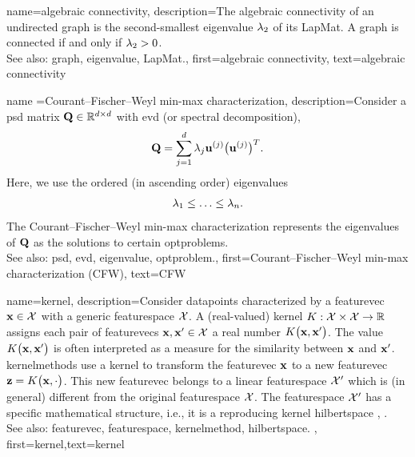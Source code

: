 {name={algebraic connectivity},
	description={The algebraic connectivity of an undirected \gls{graph} 
		is the second-smallest \gls{eigenvalue} $\lambda_{2}$ of its \gls{LapMat}. A \gls{graph} is connected if and only if 
		$\lambda_{2} >0$. 
				\\
		See also: \gls{graph}, \gls{eigenvalue}, \gls{LapMat}.},
	first={algebraic connectivity},
	text={algebraic connectivity}
}


{name ={Courant–Fischer–Weyl min-max characterization}, 
	description={Consider a \gls{psd} 
	matrix $\mathbf{Q} \in \mathbb{R}^{d \times d}$ with 
	\gls{evd} (or spectral decomposition), 
	$$ \mathbf{Q} = \sum_{j=1}^{d} \lambda_{j} {\bf u}^{(j)} \big(  {\bf u}^{(j)}  \big)^{T}.$$ 
	Here, we use the ordered (in ascending order) \glspl{eigenvalue} 
	\begin{equation}
		\nonumber
		 \lambda_{1}  \leq  \ldots \leq \lambda_{n}. 
	\end{equation}
	The Courant–Fischer–Weyl min-max characterization \cite[Th. 8.1.2]{GolubVanLoanBook} 
	represents the \glspl{eigenvalue} of $\mathbf{Q}$ as the solutions to certain \glspl{optproblem}.
			\\
		See also: \gls{psd}, \gls{evd}, \gls{eigenvalue}, \gls{optproblem}.}, 
	first={Courant–Fischer–Weyl min-max characterization (CFW)}, 
	text={CFW}
}

{name={kernel}, 
	description={Consider \glspl{datapoint} characterized by a \gls{featurevec} ${\bf x} \in \mathcal{X}$ 
		with a generic \gls{featurespace} $\mathcal{X}$. A (real-valued) kernel $K: \mathcal{X} \times \mathcal{X} \rightarrow \mathbb{R}$ 
		assigns each pair of \glspl{featurevec} ${\bf x}, {\bf x}' \in \mathcal{X}$ a real number $K\big({\bf x},{\bf x}'\big)$. 
		The value $K\big({\bf x},{\bf x}'\big)$ is often interpreted as a measure for the similarity between ${\bf x}$ 
		and ${\bf x}'$. \Glspl{kernelmethod} use a kernel to transform the \gls{featurevec} ${\bf x}$ to a new \gls{featurevec} ${\bf z} = K\big({\bf x},\cdot\big)$. 
         	This new \gls{featurevec} belongs to a linear \gls{featurespace} $\mathcal{X}'$ which is (in general)  
          	different from the original \gls{featurespace} $\mathcal{X}$. The \gls{featurespace} $\mathcal{X}'$ has 
          	a specific mathematical structure, i.e., it is a reproducing kernel \gls{hilbertspace} \cite{LearningKernelsBook}, \cite{LampertNowKernel}.
          		\\
		See also: \gls{featurevec}, \gls{featurespace}, \gls{kernelmethod}, \gls{hilbertspace}.
          },
	first={kernel},text={kernel} }
	
